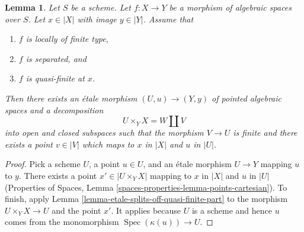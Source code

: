 \documentclass[10pt,a4paper]{amsart}
\theoremstyle{plain}
\newtheorem{lemma}[subsection]{Lemma}
\theoremstyle{definition}
\theoremstyle{remark}
\numberwithin{equation}{subsection}
\def\Spec{\mathop{\mathrm{Spec}}}
\begin{document}
\begin{lemma}
\label{lemma-etale-splits-off-just-one-quasi-finite-part}
Let $S$ be a scheme.
Let $f : X \to Y$ be a morphism of algebraic spaces over $S$.
Let $x \in |X|$ with image $y \in |Y|$. Assume that
\begin{enumerate}
\item $f$ is locally of finite type,
\item $f$ is separated, and
\item $f$ is quasi-finite at $x$.
\end{enumerate}
Then there exists an \'etale morphism $(U, u) \to (Y, y)$
of pointed algebraic spaces and a decomposition
$$
U \times_Y X = W \amalg V
$$
into open and closed subspaces such that the morphism $V \to U$ is finite
and there exists a point $v \in |V|$ which maps to $x$ in $|X|$
and $u$ in $|U|$.
\end{lemma}

\begin{proof}
Pick a scheme $U$, a point $u \in U$, and an \'etale morphism
$U \to Y$ mapping $u$ to $y$. There exists a point $x' \in |U \times_Y X|$
mapping to $x$ in $|X|$ and $u$ in $|U|$ (Properties of Spaces,
Lemma \ref{spaces-properties-lemma-points-cartesian}).
To finish, apply Lemma \ref{lemma-etale-splits-off-quasi-finite-part}
to the morphism $U \times_Y X \to U$ and the point $x'$.
It applies because $U$ is a scheme and hence $u$ comes from
the monomorphism $\Spec(\kappa(u)) \to U$.
\end{proof}
\end{document}
